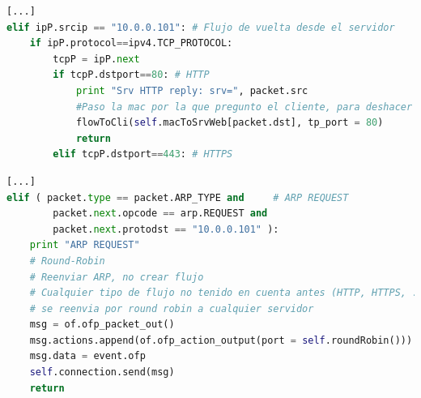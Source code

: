 \documentclass{article}
\begin{document}
\begin{lstlisting}[language=Python]
[...]
elif ipP.srcip == "10.0.0.101": # Flujo de vuelta desde el servidor
	if ipP.protocol==ipv4.TCP_PROTOCOL:
		tcpP = ipP.next
		if tcpP.dstport==80: # HTTP
			print "Srv HTTP reply: srv=", packet.src
			#Paso la mac por la que pregunto el cliente, para deshacer proxy mac
			flowToCli(self.macToSrvWeb[packet.dst], tp_port = 80)
			return
		elif tcpP.dstport==443: # HTTPS
\end{lstlisting}



\begin{lstlisting}[language=Python]
[...]
elif ( packet.type == packet.ARP_TYPE and     # ARP REQUEST
		packet.next.opcode == arp.REQUEST and
		packet.next.protodst == "10.0.0.101" ):
	print "ARP REQUEST"
	# Round-Robin
	# Reenviar ARP, no crear flujo
	# Cualquier tipo de flujo no tenido en cuenta antes (HTTP, HTTPS, ...)
	# se reenvia por round robin a cualquier servidor
	msg = of.ofp_packet_out()
	msg.actions.append(of.ofp_action_output(port = self.roundRobin()))
	msg.data = event.ofp
	self.connection.send(msg)
	return
\end{lstlisting}








\appendix
\end{document}
